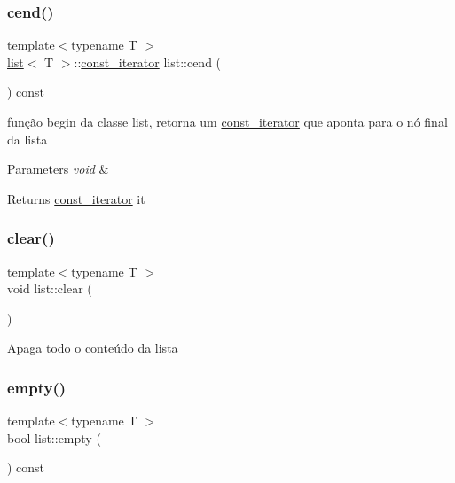 \subsubsection{\texorpdfstring{cend()}{cend()}}
{\footnotesize\ttfamily template$<$typename T $>$ \\
\mbox{\hyperlink{classsc_1_1list}{list}}$<$ T $>$\+::\mbox{\hyperlink{classsc_1_1list_1_1const__iterator}{const\+\_\+iterator}} list\+::cend (\begin{DoxyParamCaption}{ }\end{DoxyParamCaption}) const}

função begin da classe list, retorna um \mbox{\hyperlink{classsc_1_1list_1_1const__iterator}{const\+\_\+iterator}} que aponta para o nó final da lista 
\begin{DoxyParams}{Parameters}
{\em void} & \\
\hline
\end{DoxyParams}
\begin{DoxyReturn}{Returns}
\mbox{\hyperlink{classsc_1_1list_1_1const__iterator}{const\+\_\+iterator}} it 
\end{DoxyReturn}
\mbox{\label{classsc_1_1list_ada3f13df5cabc23e702baa64f1b5f76e}} 
\subsubsection{\texorpdfstring{clear()}{clear()}}
{\footnotesize\ttfamily template$<$typename T $>$ \\
void list\+::clear (\begin{DoxyParamCaption}{ }\end{DoxyParamCaption})}

Apaga todo o conteúdo da lista \mbox{\label{classsc_1_1list_aeb4d6c3d1fc142b0ff35a3ec203b7b3f}} 
\subsubsection{\texorpdfstring{empty()}{empty()}}
{\footnotesize\ttfamily template$<$typename T $>$ \\
bool list\+::empty (\begin{DoxyParamCaption}{ }\end{DoxyParamCaption}) const}

